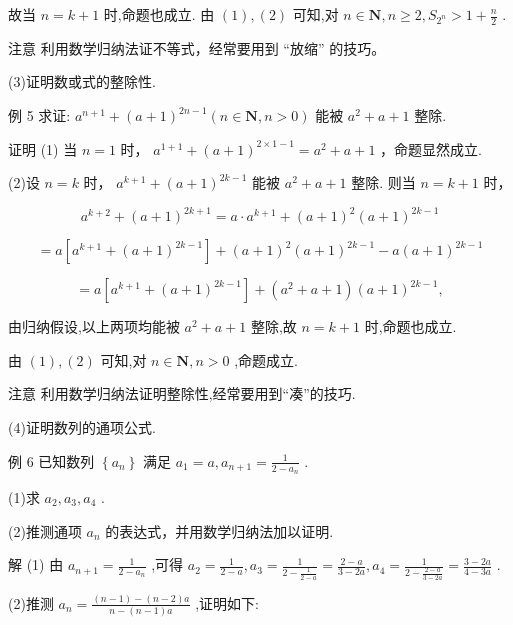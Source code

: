 \documentclass[10pt]{article}
\begin{document}
故当 \(n = k + 1\) 时,命题也成立. 由 \(\left( 1\right) ,\left( 2\right)\) 可知,对 \(n \in  \mathbf{N},n \geq  2,{S}_{{2}^{n}} > 1 + \frac{n}{2}\) .

注意 利用数学归纳法证不等式，经常要用到 “放缩” 的技巧。

(3)证明数或式的整除性.

例 5 求证: \({a}^{n + 1} + {\left( a + 1\right) }^{{2n} - 1}\left( {n \in  \mathbf{N},n > 0}\right)\) 能被 \({a}^{2} + a + 1\) 整除.

证明 (1) 当 \(n = 1\) 时， \({a}^{1 + 1} + {\left( a + 1\right) }^{2 \times  1 - 1} = {a}^{2} + a + 1\) ，命题显然成立.

(2)设 \(n = k\) 时， \({a}^{k + 1} + {\left( a + 1\right) }^{{2k} - 1}\) 能被 \({a}^{2} + a + 1\) 整除. 则当 \(n = k + 1\) 时，

\[
{a}^{k + 2} + {\left( a + 1\right) }^{{2k} + 1} = a \cdot  {a}^{k + 1} + {\left( a + 1\right) }^{2}{\left( a + 1\right) }^{{2k} - 1}
\]

\[
= a\left\lbrack  {{a}^{k + 1} + {\left( a + 1\right) }^{{2k} - 1}}\right\rbrack   + {\left( a + 1\right) }^{2}{\left( a + 1\right) }^{{2k} - 1} - a{\left( a + 1\right) }^{{2k} - 1}
\]

\[
= a\left\lbrack  {{a}^{k + 1} + {\left( a + 1\right) }^{{2k} - 1}}\right\rbrack   + \left( {{a}^{2} + a + 1}\right) {\left( a + 1\right) }^{{2k} - 1},
\]

由归纳假设,以上两项均能被 \({a}^{2} + a + 1\) 整除,故 \(n = k + 1\) 时,命题也成立.

由 \(\left( 1\right) ,\left( 2\right)\) 可知,对 \(n \in  \mathbf{N},n > 0\) ,命题成立.

注意 利用数学归纳法证明整除性,经常要用到“凑”的技巧.

(4)证明数列的通项公式.

例 6 已知数列 \(\left\{  {a}_{n}\right\}\) 满足 \({a}_{1} = a,{a}_{n + 1} = \frac{1}{2 - {a}_{n}}\) .

(1)求 \({a}_{2},{a}_{3},{a}_{4}\) .

(2)推测通项 \({a}_{n}\) 的表达式，并用数学归纳法加以证明.

解 (1) 由 \({a}_{n + 1} = \frac{1}{2 - {a}_{n}}\) ,可得 \({a}_{2} = \frac{1}{2 - a},{a}_{3} = \frac{1}{2 - \frac{1}{2 - a}} = \frac{2 - a}{3 - {2a}},{a}_{4} = \frac{1}{2 - \frac{2 - a}{3 - {2a}}} = \frac{3 - {2a}}{4 - {3a}}\) .

(2)推测 \({a}_{n} = \frac{\left( {n - 1}\right)  - \left( {n - 2}\right) a}{n - \left( {n - 1}\right) a}\) ,证明如下:
\end{document}
